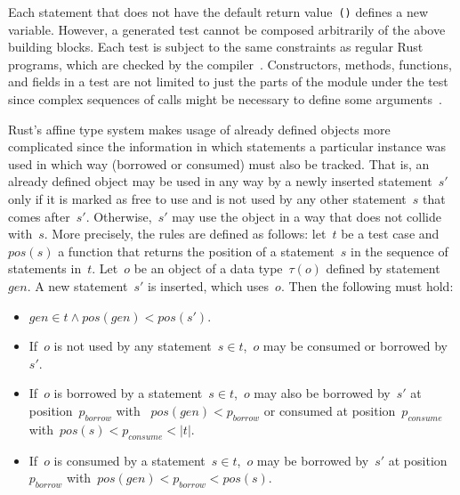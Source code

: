 \documentclass[paper=a4,%
  twoside,%
  BCOR4mm,%
  abstract=true,%
  toc=bibliography,%
  chapterprefix=true,%
  toc=bibliographynumbered,%
  open=right,%
  english,%
  pagesize=pdftex]{scrreprt}
\begin{document}
Each statement that does not have the default return value~\lstinline{()} defines a new variable. However, a generated test cannot be composed arbitrarily of the above building blocks. Each test is subject to the same constraints as regular Rust programs, which are checked by the compiler~\cite{Tonella2004}. Constructors, methods, functions, and fields in a test are not limited to just the parts of the module under the test since complex sequences of calls might be necessary to define some arguments~\cite{Fraser2012}.

Rust's affine type system makes usage of already defined objects more complicated since the information in which statements a particular instance was used in which way (borrowed or consumed) must also be tracked. That is, an already defined object may be used in any way by a newly inserted statement~$s'$ only if it is marked as free to use and is not used by any other statement~$s$ that comes after~$s'$. Otherwise,~$s'$ may use the object in a way that does not collide with~$s$. More precisely, the rules are defined as follows: let~$t$ be a test case and $pos(s)$ a function that returns the position of a statement~$s$ in the sequence of statements in~$t$. Let~$o$ be an object of a data type~$\tau(o)$ defined by statement~$gen$. A new statement~$s'$ is inserted, which uses~$o$. Then the following must hold:
\begin{itemize}
    \item $gen \in t \wedge pos(gen) < pos(s')$.
    \item If~$o$ is not used by any statement~$s \in t$,~$o$ may be consumed or borrowed by~$s'$.
    \item If~$o$ is borrowed by a statement~$s \in t$,~$o$ may also be borrowed by~$s'$ at position~$p_{borrow}$ with ~$pos(gen) < p_{borrow}$ or consumed at position~$p_{consume}$ with~$pos(s) < p_{consume} < \left|t\right|$.
    \item If~$o$ is consumed by a statement~$s \in t$,~$o$ may be borrowed by~$s'$ at position~$p_{borrow}$ with~$pos(gen) < p_{borrow} < pos(s)$.
\end{itemize}

\end{document}
